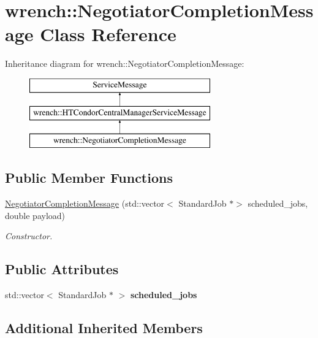 \hypertarget{classwrench_1_1_negotiator_completion_message}{}\section{wrench\+:\+:Negotiator\+Completion\+Message Class Reference}
\label{classwrench_1_1_negotiator_completion_message}
Inheritance diagram for wrench\+:\+:Negotiator\+Completion\+Message\+:\begin{figure}[H]
\begin{center}
\leavevmode
\includegraphics[height=3.000000cm]{classwrench_1_1_negotiator_completion_message}
\end{center}
\end{figure}
\subsection*{Public Member Functions}
\begin{DoxyCompactItemize}
\item 
\hyperlink{classwrench_1_1_negotiator_completion_message_aece506a0df6a8a5bf7484467f05c9b19}{Negotiator\+Completion\+Message} (std\+::vector$<$ Standard\+Job $\ast$$>$ scheduled\+\_\+jobs, double payload)
\begin{DoxyCompactList}\small\item\em Constructor. \end{DoxyCompactList}\end{DoxyCompactItemize}
\subsection*{Public Attributes}
\begin{DoxyCompactItemize}
\item 
\mbox{\label{classwrench_1_1_negotiator_completion_message_aeaf67aaa5ac0bc830eff59ef6d51d9d5}} 
std\+::vector$<$ Standard\+Job $\ast$ $>$ {\bfseries scheduled\+\_\+jobs}
\end{DoxyCompactItemize}
\subsection*{Additional Inherited Members}


